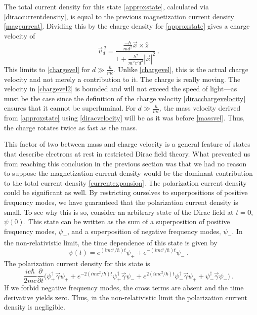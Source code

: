 \documentclass[onecolumn,secnumarabic,amsmath,amssymb,balancelastpage,nofootinbib]{article}
\begin{document}
The total current density for this state \eqref{approxstate}, calculated via \eqref{diraccurrentdensity}, is equal to the previous magnetization current density \eqref{magcurrent}.  Dividing this by the charge density for \eqref{approxstate} gives a charge velocity of
\begin{equation}
\vec{v}_d^{\:q}=\frac{\frac{-\hbar}{m d^2}\vec{x}\times\hat{z}}{1+\frac{\hbar^2}{m^2 c^2 d^4}|\vec{x}|^2}\ .
\label{chargevel2}
\end{equation}
This limits to \eqref{chargevel} for $d \gg \frac{\hbar}{m c}$.  Unlike \eqref{chargevel}, this is the actual charge velocity and not merely a contribution to it.  The charge is really moving.  The velocity in \eqref{chargevel2} is bounded and will not exceed the speed of light---as must be the case since the definition of the charge velocity \eqref{diracchargevelocity} ensures that it cannot be superluminal.  For $d \gg \frac{\hbar}{m c}$, the mass velocity derived from \eqref{approxstate} using \eqref{diracvelocity} will be as it was before \eqref{massvel}.  Thus, the charge rotates twice as fast as the mass.

This factor of two between mass and charge velocity is a general feature of states that describe electrons at rest in restricted Dirac field theory.  What prevented us from reaching this conclusion in the previous section was that we had no reason to suppose the magnetization current density would be the dominant contribution to the total current density \eqref{currentexpansion}.  The polarization current density could be significant as well.  By restricting ourselves to superpositions of positive frequency modes, we have guaranteed that the polarization current density is small.  To see why this is so, consider an arbitrary state of the Dirac field at $t=0$, $\psi(0)$.  This state can be written as the sum of a superposition of positive frequency modes, $\psi_+$, and a superposition of negative frequency modes, $\psi_-$.  In the non-relativistic limit, the time dependence of this state is given by
\begin{equation}
\psi(t)=e^{(i m c^2 / \hbar) t}\psi_++e^{-(i m c^2 / \hbar) t}\psi_-\ .
\end{equation}
The polarization current density for this state is
\begin{equation}
\frac{i e\hbar}{2 m c}\frac{\partial}{\partial t}\big(\psi_+^\dagger \vec{\gamma} \psi_++e^{-2(i m c^2 / \hbar) t}\psi_+^\dagger \vec{\gamma} \psi_-+e^{2(i m c^2 / \hbar) t}\psi_-^\dagger \vec{\gamma} \psi_++\psi_-^\dagger \vec{\gamma} \psi_-\big)\ .
\end{equation}
If we forbid negative frequency modes, the cross terms are absent and the time derivative yields zero.  Thus, in the non-relativistic limit the polarization current density is negligible.
\end{document}
